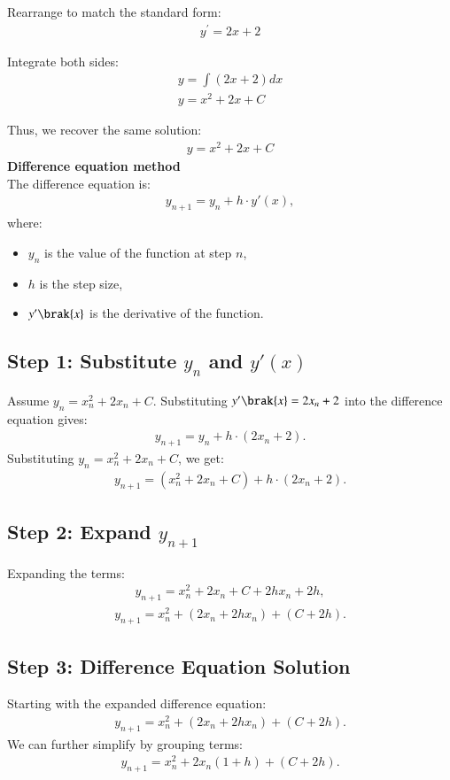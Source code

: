 \documentclass[journal]{IEEEtran}
\begin{document}
Rearrange to match the standard form:
\begin{align}
    y^\prime = 2x + 2
\end{align}

Integrate both sides:
\begin{align}
    y = \int (2x + 2) dx \\
    y = x^2 + 2x + C
\end{align}

Thus, we recover the same solution:
\begin{align}
    y = x^2 + 2x + C
\end{align}
 \textbf{ Difference equation method }\\
The difference equation is:
\begin{align}
y_{n+1} = y_n + h \cdot y'(x),
\end{align}
where:
\begin{itemize}
    \item  $y_n$ is the value of the function at step  $n$,
    \item $h$ is the step size,
    \item $y'\brak{x}$ is the derivative of the function.
\end{itemize}
\subsection*{Step 1: Substitute $y_n$ and $y'(x)$}
Assume $y_n = x_n^2 + 2x_n + C$. Substituting  $y'\brak{x} = 2x_n + 2$ into the difference equation gives:
\begin{align}
y_{n+1} = y_n + h \cdot (2x_n + 2).
\end{align}
Substituting  $y_n = x_n^2 + 2x_n + C $, we get:
\begin{align}
y_{n+1} = (x_n^2 + 2x_n + C) + h \cdot (2x_n + 2).
\end{align}

\subsection*{Step 2: Expand  $y_{n+1}$}
Expanding the terms:
\begin{align}
y_{n+1} = x_n^2 + 2x_n + C + 2hx_n + 2h,
\end{align}
\begin{align}
y_{n+1} = x_n^2 + (2x_n + 2hx_n) + (C + 2h).
\end{align}
\subsection*{Step 3: Difference Equation Solution}
Starting with the expanded difference equation:
\begin{align}
y_{n+1} = x_n^2 + (2x_n + 2hx_n) + (C + 2h).
\end{align}
We can further simplify by grouping terms:
\begin{align}
y_{n+1} = x_n^2 + 2x_n(1 + h) + (C + 2h).
\end{align}
\end{document}
